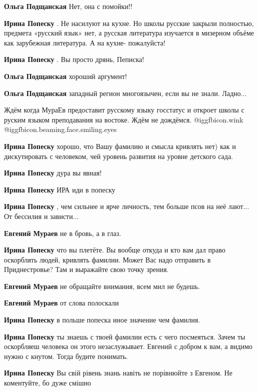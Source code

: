 \begin{itemize}
\begin{itemize}
\textbf{Ольга Подщанская}
Нет, она с помойки!!

\textbf{Ирина Попеску} . Не насилуют на кухне. Но школы русские закрыли полностью, предмета «русский язык» нет, а русская литература изучается в мизерном объёме как зарубежная литература. А на кухне- пожалуйста!

\textbf{Ирина Попеску} . Вы просто дрянь, Пеписка!

\textbf{Ольга Подщанская} хороший аргумент!

\textbf{Ольга Подщанская} западный регион многоязычен, если вы не знали. Ладно...

Ждём когда МураЕв предоставит русскому языку госстатус и откроет школы с руским языком преподавания на востоке. Ждём не дождёмся. @igg{fbicon.wink}  @igg{fbicon.beaming.face.smiling.eyes} 

\textbf{Ирина Попеску} хорошо, что Вашу фамилию и смысла кривлять нет) как и дискутировать с человеком, чей уровень развития на уровне детского сада.

\textbf{Ирина Попеску} дура вы явная!

\textbf{Ирина Попеску} ИРА иди в попеску

\textbf{Ирина Попеску} , чем сильнее и ярче личность, тем больше псов на неё лают...
От бессилия и зависти...

\textbf{Евгений Мураев} не в бровь, а в глаз.

\textbf{Ирина Попеску} что вы плетёте. Вы вообще откуда и кто вам дал право оскорблять людей, кривлять фамилии. Может Вас надо отправить в Приднестровье? Там и выражайте свою точку зрения.

\textbf{Евгений Мураев} не обращайте внимания, всем мил не будешь.

\textbf{Евгений Мураев} от слова полоскали

\textbf{Ирина Попеску} в польше попеска иное значение чем фамилия.

\textbf{Ирина Попеску} ты знаешь с твоей фамилии есть с чего посмеяться. Зачем ты оскорбляеш человека он этого незаслужывает. Евгений с добром к вам, а видимо нужно с кнутом. Тогда будите понимать.

\textbf{Ирина Попеску} Вы свій рівень знань навіть не порівнюйте з Евгеном. Не коментуйте, бо дуже смішно


\end{itemize}
\end{itemize}
